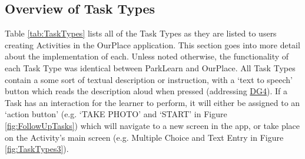 \subsection{Overview of Task Types}
\label{sec:TaskTypes}
Table \ref{tab:TaskTypes} lists all of the Task Types as they are listed to users creating Activities in the OurPlace application. This section goes into more detail about the implementation of each. Unless noted otherwise, the functionality of each Task Type was identical between ParkLearn and OurPlace. All Task Types contain a some sort of textual description or instruction, with a `text to speech' button which reads the description aloud when pressed (addressing \hyperref[DG4]{DG4}). If a Task has an interaction for the learner to perform, it will either be assigned to an `action button' (e.g. `TAKE PHOTO' and `START' in Figure \ref{fig:FollowUpTasks}) which will navigate to a new screen in the app, or take place on the Activity's main screen (e.g. Multiple Choice and Text Entry in Figure \ref{fig:TaskTypes3}). 

